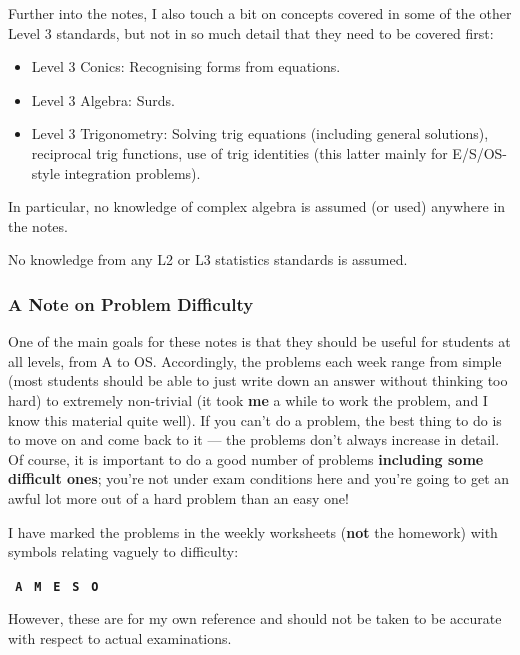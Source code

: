 Further into the notes, I also touch a bit on concepts covered in some of the other Level 3 standards,
but not in so much detail that they need to be covered first:
\begin{itemize}
  \item Level 3 Conics: Recognising forms from equations.
  \item Level 3 Algebra: Surds.
  \item Level 3 Trigonometry: Solving trig equations (including general solutions), reciprocal trig functions, use
                              of trig identities (this latter mainly for E/S/OS-style integration problems).
\end{itemize}
In particular, no knowledge of complex algebra is assumed (or used) anywhere in the notes.

No knowledge from any L2 or L3 statistics standards is assumed.

\subsubsection*{A Note on Problem Difficulty}
One of the main goals for these notes is that they should be useful for students at all levels, from A to OS. Accordingly, the
problems each week range from simple (most students should be able to just write down an answer without thinking too hard) to
extremely non-trivial (it took \textbf{me} a while to work the problem, and I know this material quite well). If you can't do
a problem, the best thing to do is to move on and come back to it --- the problems don't always increase in detail. Of course,
it is important to do a good number of problems \textbf{including some difficult ones}; you're not under exam conditions here
and you're going to get an awful lot more out of a hard problem than an easy one!

I have marked the problems in the weekly worksheets (\textbf{not} the homework) with symbols relating vaguely to difficulty:

\begin{center}
\texttt{\textbf{\color{Cerulean} A}}
\texttt{\textbf{\color{PineGreen} M}}
\texttt{\textbf{\color{WildStrawberry} E}}
\texttt{\textbf{\color{Goldenrod} S}}
\texttt{\textbf{\color{BurntOrange} O}}
\end{center}

However, these are for my own reference and should not be taken to be accurate with respect to actual examinations.

